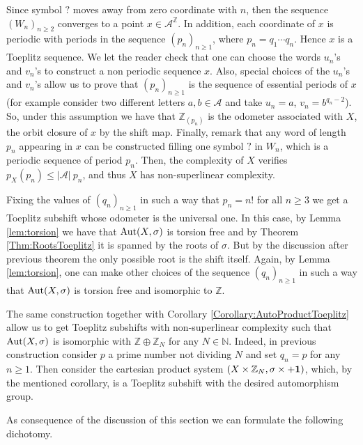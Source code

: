 \documentclass{daj}
\theoremstyle{plain}
\theoremstyle{definition}
\begin{document}
Since symbol $\text{?}$ moves away from zero coordinate with $n$, then the sequence $(W_n)_{n\geq 2}$ converges to a point $x\in\mathcal{A}^\mathbb{Z}$. In addition, each coordinate of $x$ is periodic with periods in the sequence $(p_n)_{n\geq 1}$, where $p_n=q_1\cdots q_n$. Hence $x$ is a Toeplitz sequence. We let the reader check that one can choose the words $u_n$'s and $v_n$'s to construct a non periodic sequence $x$. Also, special choices of the $u_n$'s and $v_n$'s allow us to prove that $(p_n)_{n\geq 1}$ is the sequence of essential periods of $x$ (for example consider two different letters  $a,b \in {\mathcal A}$ and take $u_n=a$, $v_n=b^{q_n-2}$). So, under this assumption we have that 
$\mathbb{Z}_{(p_n)}$ is the odometer associated with $X$, the orbit closure of $x$ by the shift map.
Finally, remark that any word of length $p_n$ appearing in $x$ can be constructed filling one symbol $\text{?}$ in $W_n$, which is a periodic sequence of period $p_n$. Then, the complexity of $X$ verifies $p_X(p_n)\leq |{\mathcal A}| \ p_n$, and thus $X$ has non-superlinear complexity. 

Fixing the values of $(q_n)_{n\geq 1}$ in such a way that $p_{n}=n!$ for all $n\geq 3$ we get a Toeplitz subshift whose odometer is the universal one. In this case, by Lemma \ref{lem:torsion} we have that ${\rm Aut}(X,\sigma)$ is torsion free and by Theorem \ref{Thm:RootsToeplitz} it is spanned by the roots of $\sigma$. But by the discussion after previous theorem the only possible root is the shift itself. Again, by Lemma \ref{lem:torsion}, one can make other choices of the sequence $(q_n)_{n\geq 1}$ in such a way that ${\rm Aut}(X,\sigma)$ is torsion free and isomorphic to $\mathbb{Z}$. 

The same construction together with Corollary \ref{Corollary:AutoProductToeplitz} allow us to get Toeplitz subshifts with non-superlinear complexity such that ${\rm Aut}(X,\sigma)$ is isomorphic with  $\mathbb{Z} \oplus \mathbb{Z}_N$ for any $N\in \mathbb{N}$. Indeed, in previous construction consider $p$ a prime number not dividing $N$ and set $q_n=p$ for any $n\geq 1$. Then consider the cartesian product system 
$(X\times \mathbb{Z}_N,\sigma\times +{\bf 1})$, which, by the mentioned corollary, is a Toeplitz subshift with the desired automorphism group.

As consequence of the discussion of this section we can formulate the following dichotomy. 
\end{document}
